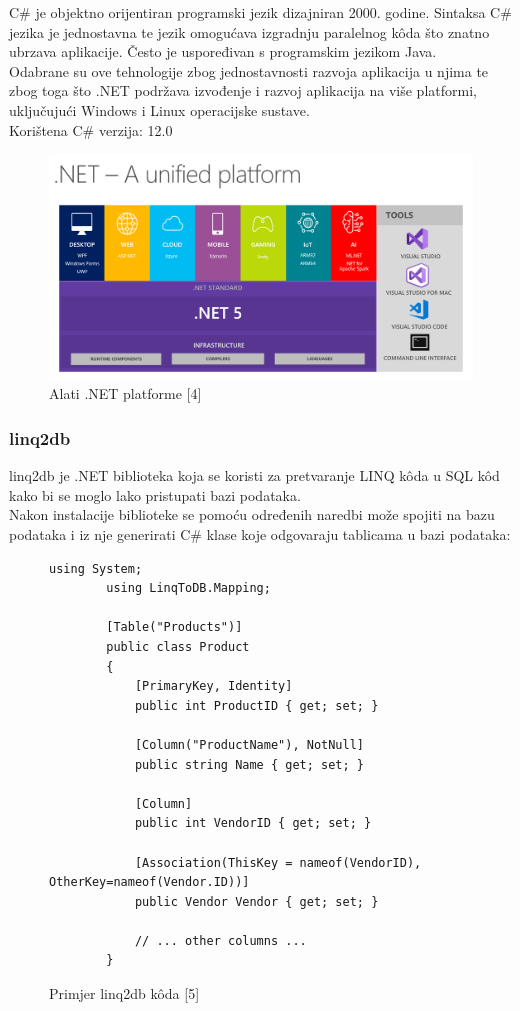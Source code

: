 \documentclass[zavrsnirad]{fer}
\begin{document}
C\# je objektno orijentiran programski jezik dizajniran 2000. godine. Sintaksa C\# jezika je jednostavna te jezik omogućava izgradnju paralelnog kôda što znatno ubrzava aplikacije. Često je uspoređivan s programskim jezikom Java.
\\Odabrane su ove tehnologije zbog jednostavnosti razvoja aplikacija u njima te zbog toga što .NET podržava izvođenje i razvoj aplikacija na više platformi, uključujući Windows i Linux operacijske sustave.
\\Korištena C\# verzija: 12.0

\begin{figure}[htb]
	\centering
	\includegraphics[trim={0 0 15cm 5cm},clip,width=1\linewidth]{images/dotnet5_platform.png} 
	\caption{Alati .NET platforme [4]}
	\label{slk:dotnet}
\end{figure}
\FloatBarrier

\subsubsection{linq2db}
\label{pog:linq2db}
linq2db je .NET biblioteka koja se koristi za pretvaranje LINQ kôda u SQL kôd kako bi se moglo lako pristupati bazi podataka.
\\Nakon instalacije biblioteke se pomoću određenih naredbi može spojiti na bazu podataka i iz nje generirati C\# klase koje odgovaraju tablicama u bazi podataka:
\begin{figure}[htp]
	\centering
	\begin{lstlisting}[language=CSharp]
		using System;
		using LinqToDB.Mapping;
		
		[Table("Products")]
		public class Product
		{
			[PrimaryKey, Identity]
			public int ProductID { get; set; }
			
			[Column("ProductName"), NotNull]
			public string Name { get; set; }
			
			[Column]
			public int VendorID { get; set; }
			
			[Association(ThisKey = nameof(VendorID), OtherKey=nameof(Vendor.ID))]
			public Vendor Vendor { get; set; }
			
			// ... other columns ...
		}
	\end{lstlisting}
	\caption{Primjer linq2db kôda [5]}
\end{figure}
\FloatBarrier
\end{document}
